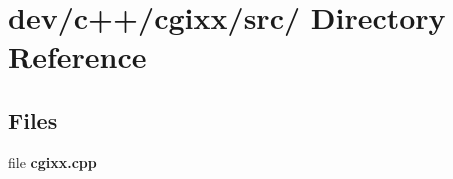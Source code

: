 \section{dev/c++/cgixx/src/ Directory Reference}
\label{dir_9baccb16b03fea1e4f8cb171d271cf10}
\subsection*{Files}
\begin{CompactItemize}
\item 
file \textbf{cgixx.cpp}
\end{CompactItemize}
